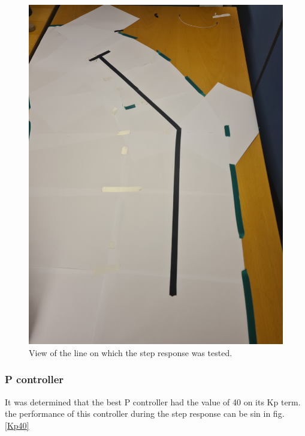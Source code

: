 \begin{figure}[H]
    \centering
    \includegraphics[width=\textwidth]{assets/Step Response.jpg}
    \caption{View of the line on which the step response was tested.}
    \label{Step Response}
\end{figure}

\subsubsection{P controller}
It was determined that the best P controller had the value of 40 on its Kp term. the performance of this controller during the step response can be sin in fig. \ref{Kp40}

